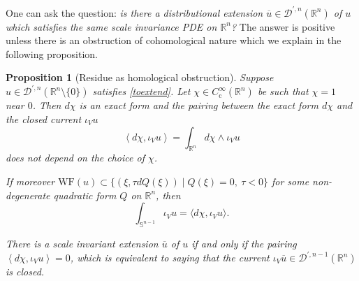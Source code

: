 \documentclass[10pt]{amsart}
\let\pazocal\mathscr
\newtheorem{proposition}[theorem]{Proposition}
\theoremstyle{definition}
\newcommand\rr{{\mathbb R}}
\renewcommand\c{\mathrm{c}}
\let\st\mid
\let\Feuler V
\let\exd u
\newcommand\wf{\mathrm{WF}}
\begin{document}
One can ask the question: \emph{is there a distributional extension
$\overline{\exd}\in \pazocal{D}^{\prime,n}(\rr^n)$ of $\exd$ which satisfies the same scale invariance PDE on $\rr^n$? } The answer
is positive unless there is an obstruction of cohomological nature which we explain in the following proposition.

\begin{proposition}[Residue as homological obstruction]\label{p:residue}
Suppose \hbox{$\exd\!\in\!\pazocal{D}^{\prime,n}(\rr^n\!\setminus\!\{0\})$} satisfies \eqref{toextend}. Let $\chi\in C^\infty_\c(\rr^n)$ be such that $\chi=1$ near $0$.
Then $d\chi$ is an exact form and
the pairing between the exact form $d\chi$ and the closed current $\iota_\Feuler \exd $
\[
\left\langle d\chi, \iota_\Feuler \exd \right\rangle=\int_{\rr^n} d\chi\wedge \iota_\Feuler \exd
\]
{does not depend} on the choice of $\chi$.

If moreover $\wf(\exd)\subset \{(\xi,\tau dQ(\xi)) \st Q(\xi)=0,\ \tau<0\}$ for some non-degenerate quadratic form $Q$ on $\rr^n$, then
\[
\int_{\mathbb{S}^{n-1}} \iota_\Feuler \exd=\langle d\chi, \iota_\Feuler \exd\rangle.
\]

There is a scale invariant extension $\overline{\exd}$ of $u$ if and only if
the pairing $\left\langle d\chi, \iota_\Feuler \exd \right\rangle=0$, which is equivalent to saying that
the current $\iota_\Feuler \overline{\exd}\in \pazocal{D}^{\prime,n-1}(\rr^n)$ is closed.
\end{proposition}
\end{document}
